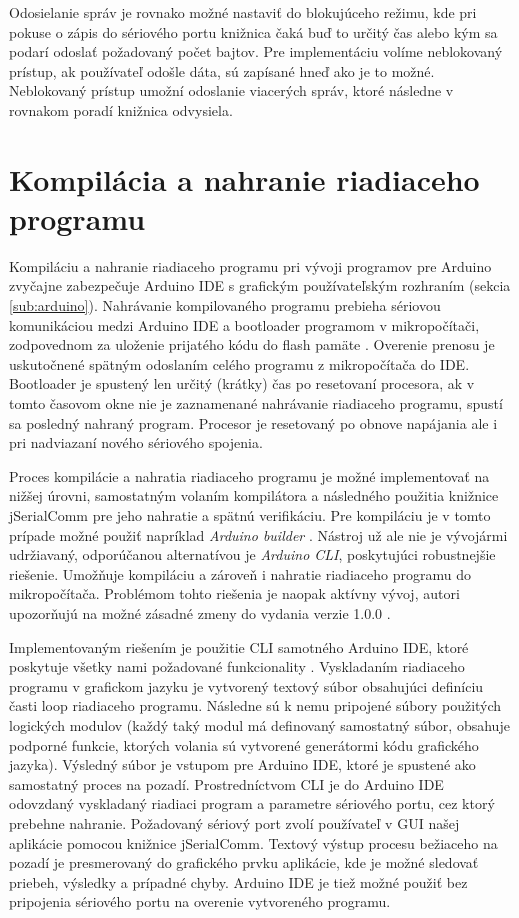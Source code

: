 Odosielanie správ je rovnako možné nastaviť do blokujúceho režimu, kde pri pokuse o zápis do sériového portu knižnica čaká buď to určitý čas alebo kým sa podarí odoslať požadovaný počet bajtov. Pre implementáciu volíme neblokovaný prístup, ak používateľ odošle dáta, sú zapísané hneď ako je to možné. Neblokovaný prístup umožní odoslanie viacerých správ, ktoré následne v rovnakom poradí knižnica odvysiela.


\section{Kompilácia a nahranie riadiaceho programu}
\label{sub:arduinoIDE}
Kompiláciu a nahranie riadiaceho programu pri vývoji programov pre Arduino zvyčajne zabezpečuje Arduino IDE s grafickým používateľským rozhraním (sekcia \ref{sub:arduino}). Nahrávanie kompilovaného programu prebieha sériovou komunikáciou medzi Arduino IDE a bootloader programom v mikropočítači, zodpovednom za uloženie prijatého kódu do flash pamäte \cite{sketchUpload}. Overenie prenosu je uskutočnené spätným odoslaním celého programu z mikropočítača do IDE. Bootloader je spustený len určitý (krátky) čas po resetovaní procesora, ak v tomto časovom okne nie je zaznamenané nahrávanie riadiaceho programu, spustí sa posledný nahraný program. Procesor je resetovaný po obnove napájania ale i pri nadviazaní nového sériového spojenia.

Proces kompilácie a nahratia riadiaceho programu je možné implementovať na nižšej úrovni, samostatným volaním kompilátora a následného použitia knižnice jSerialComm pre jeho nahratie a spätnú verifikáciu. Pre kompiláciu je v tomto prípade možné použiť napríklad \textit{Arduino builder} \cite{arduinoBuilder}. Nástroj už ale nie je vývojármi udržiavaný, odporúčanou alternatívou je \textit{Arduino CLI}, poskytujúci robustnejšie riešenie. Umožňuje kompiláciu a zároveň i nahratie riadiaceho programu do mikropočítača. Problémom tohto riešenia je naopak aktívny vývoj, autori upozorňujú na možné zásadné zmeny do vydania verzie 1.0.0 \cite{arduinoCli}.

Implementovaným riešením je použitie CLI samotného Arduino IDE, ktoré poskytuje všetky nami požadované funkcionality \cite{arduinoIdeCli}. Vyskladaním riadiaceho programu v grafickom jazyku je vytvorený textový súbor obsahujúci definíciu časti loop riadiaceho programu. Následne sú k nemu pripojené súbory použitých logických modulov (každý taký modul má definovaný samostatný súbor, obsahuje podporné funkcie, ktorých volania sú vytvorené generátormi kódu grafického jazyka). Výsledný súbor je vstupom pre Arduino IDE, ktoré je spustené ako samostatný proces na pozadí. Prostredníctvom CLI je do Arduino IDE odovzdaný vyskladaný riadiaci program a parametre sériového portu, cez ktorý prebehne nahranie. Požadovaný sériový port zvolí používateľ v GUI našej aplikácie pomocou knižnice jSerialComm. Textový výstup procesu bežiaceho na pozadí je presmerovaný do grafického prvku aplikácie, kde je možné sledovať priebeh, výsledky a prípadné chyby. Arduino IDE je tiež možné použiť bez pripojenia sériového portu na overenie vytvoreného programu.


